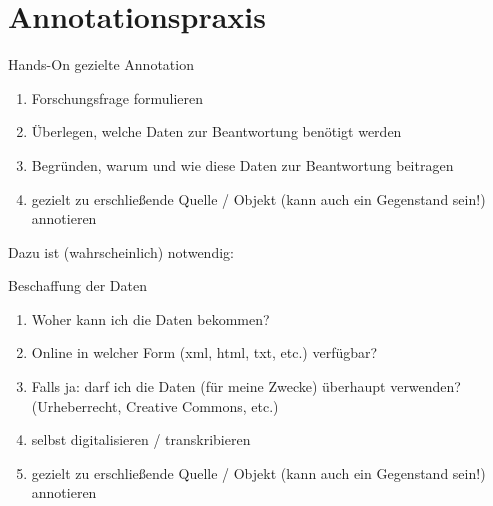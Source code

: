 \section{Annotationspraxis}
\begin{frame}[allowframebreaks]{Hands-On gezielte Annotation}
\\ 
\smallskip 

 \footnotesize
\begin{enumerate}
    \item Forschungsfrage formulieren
    \item Überlegen, welche Daten zur Beantwortung benötigt werden
    \item Begründen, warum und wie diese Daten zur Beantwortung beitragen
    \item gezielt zu erschließende Quelle / Objekt (kann auch ein Gegenstand sein!) annotieren
\end{enumerate}

Dazu ist (wahrscheinlich)  notwendig:\\[0.5em]
\end{frame}

\begin{frame}[allowframebreaks]{Beschaffung der Daten}

\begin{enumerate}
    \item Woher kann ich die Daten bekommen? 
    \item Online in welcher Form (xml, html, txt, etc.) verfügbar?
    \item Falls ja: darf ich die Daten (für meine Zwecke) überhaupt verwenden? (Urheberrecht, Creative Commons, etc.)
    \item selbst digitalisieren / transkribieren
    \item gezielt zu erschließende Quelle / Objekt (kann auch ein Gegenstand sein!) annotieren
\end{enumerate}

\end{frame}


